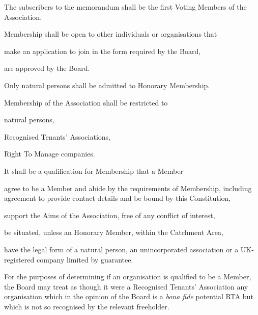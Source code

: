 \documentclass[10pt]{mk-articles-of-association}
\newcommand{\EC}[0]{Board}
\newcommand{\Exec}[0]{\EC{} }
\newcommand{\RTA}[0]{Recognised Tenants' Association}
\begin{document}
\begin{constenum}

  \item The subscribers to the memorandum shall be the first Voting Members
    of the Association.

  \item Membership shall be open to other individuals or organisations that
    \begin{constenum}
      \item make an application to join in the form required by the \EC, \ITand
      \item are approved by the \EC.
    \end{constenum}

  \item Only natural persons shall be admitted to Honorary Membership.

  \item Membership of the Association shall be restricted to
    \begin{constenum}
    \item natural persons,
    \item \RTA{}s, \ITand
    \item Right To Manage companies.
    \end{constenum}

  \item It shall be a qualification for Membership that a Member
    \begin{constenum}

    \item agree to be a Member and abide by the requirements of
      Membership, including agreement to provide contact details and
      be bound by this Constitution,

    \item support the Aims of the Association, free of any conflict
      of interest,

    \item be situated, unless an Honorary Member,
      within the Catchment Area,\label{catchmentqual}
      
    \item have the legal form of a natural person, an unincorporated
      association or a UK-registered company limited by guarantee.

    \end{constenum}

  \item For the purposes of determining if an organisation is
    qualified to be a Member, the \Exec may treat as though it were a
    \RTA{} any organisation which in the opinion of the \Exec is a
    \textit{bona fide} potential RTA but which is not so recognised by
    the relevant freeholder.



\end{constenum}
\end{document}
